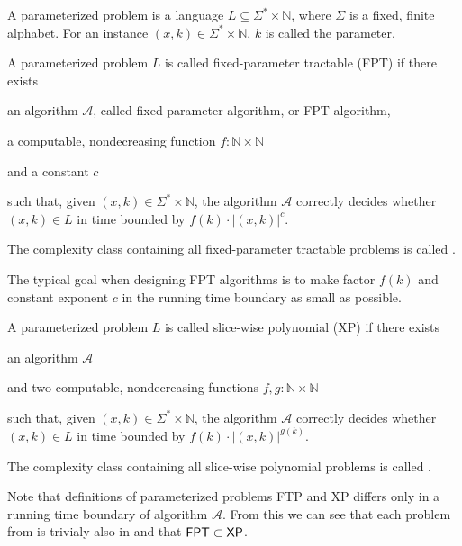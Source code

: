 
\begin{definition}
    A parameterized problem is a language $L \subseteq \Sigma^* \times \mathbb{N}$, where
    $\Sigma$ is a fixed, finite alphabet. For an instance $(x, k) \in \Sigma^* \times \mathbb{N}$, $k$ is called the parameter.
\end{definition}

\begin{definition}[FPT]
    A parameterized problem $L$ is called fixed-parameter tractable (FPT) if there exists
    \begin{description}
        \item an algorithm $\mathcal{A}$, called fixed-parameter algorithm, or FPT algorithm,
        \item a computable, nondecreasing function $f : \mathbb{N} \times \mathbb{N}$
        \item and a constant $c$
    \end{description}
    such that, given $(x,k) \in \Sigma^* \times \mathbb{N}$,
    the algorithm $\mathcal{A}$ correctly decides whether $(x, k) \in L$ in time bounded by
    $f(k) \cdot |(x,k)|^c$.
\end{definition}
The complexity class containing all fixed-parameter tractable problems is called \FPT.

The typical goal when designing FPT algorithms is to make factor $f(k)$ and constant exponent $c$
in the running time boundary as small as possible.

\begin{definition}[XP]
    A parameterized problem $L$ is called slice-wise polynomial (XP) if there exists
    \begin{description}
        \item an algorithm $\mathcal{A}$
        \item and two computable, nondecreasing functions $f,g : \mathbb{N} \times \mathbb{N}$
    \end{description}
    such that, given $(x,k) \in \Sigma^* \times \mathbb{N}$,
    the algorithm $\mathcal{A}$ correctly decides whether $(x, k) \in L$ in time bounded by
    $f(k) \cdot |(x,k)|^{g(k)}$.
\end{definition}
The complexity class containing all slice-wise polynomial problems is called \XP.

Note that definitions of parameterized problems FTP and XP differs only in a running time boundary of algorithm $\mathcal{A}$.
From this we can see that each problem from \FPT is trivialy also in \XP and that $\textsf{FPT} \subset \textsf{XP}$.

